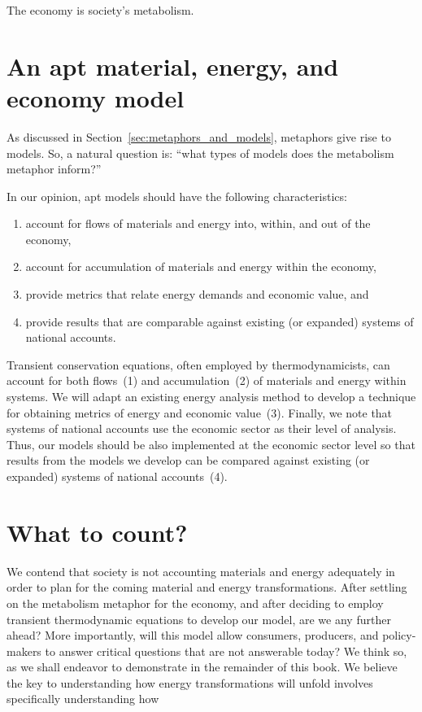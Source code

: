 The economy is society's metabolism.\cite{F-K1998, Giampietro2000, Giampietro2013}


\section{An apt material, energy, and economy model}
\label{sec:apt_models}

As discussed in Section~\ref{sec:metaphors_and_models}, 
metaphors give rise to models.
So, a natural question is: 
``what types of models does the metabolism metaphor inform?''

In our opinion, apt models should have the following characteristics:

\begin{enumerate}
	\item{account for flows of materials and energy into, within, and out of the economy,}
	\item{account for accumulation of materials and energy within the economy,}
	\item{provide metrics that relate energy demands and economic value, and}
	\item{provide results that are comparable against existing 
			(or expanded) systems of national accounts.}
\end{enumerate}

Transient conservation equations, often employed by thermodynamicists, 
can account for both flows~(1) and accumulation~(2) of materials
and energy within systems.
We will adapt an existing energy analysis method to develop a 
technique for obtaining metrics of energy and economic value~(3).
Finally, we note that systems of national accounts use the economic sector
as their level of analysis. 
Thus, our models should be also implemented at the economic sector level
so that results from the models we develop can be 
compared against existing (or expanded) systems of national accounts~(4).


\section{What to count?}
\label{sec:what_to_count}

We contend that society is not accounting materials and energy adequately 
in order to plan for the coming material and energy transformations.
After settling on the metabolism metaphor for the economy, 
and after deciding to employ transient thermodynamic equations to develop our model, 
are we any further ahead?
More importantly, will this model allow consumers, producers,
and policy-makers to answer critical questions that are not
answerable today? 
We think so, as we shall endeavor to demonstrate in the remainder of this book.
We believe the key to understanding how energy transformations will unfold
involves specifically understanding how


